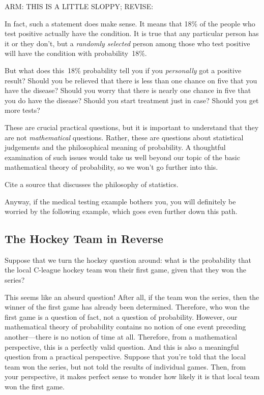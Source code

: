 \begin{editingnotes}
ARM: THIS IS A LITTLE SLOPPY; REVISE:
\end{editingnotes}

In fact, such a statement does make sense.  It means that 18\% of the
people who test positive actually have the condition.  It is true that
any particular person has it or they don't, but a \emph{randomly
  selected} person among those who test positive will have the
condition with probability~18\%.

But what does this~18\% probability tell you if you \emph{personally}
got a positive result?  Should you be relieved that there is less than
one chance on five that you have the disease?  Should you worry that
there is nearly one chance in five that you do have the disease?
Should you start treatment just in case?  Should you get more tests?

These are crucial practical questions, but it is important to
understand that they are not \emph{mathematical} questions.  Rather,
these are questions about statistical judgements and the philosophical
meaning of probability.  A thoughtful examination of such issues would
take us well beyond our topic of the basic mathematical theory of
probability, so we won't go further into this.

\begin{editingnotes}
Cite a source that discusses the philosophy of statistics.
\end{editingnotes}

Anyway, if the medical testing example bothers you, you will
definitely be worried by the following example, which goes even
further down this path.

\subsection{The Hockey Team in Reverse}

Suppose that we turn the hockey question around: what is the
probability that the local C-league hockey team won their first game,
given that they won the series?

This seems like an absurd question!  After all, if the team won the
series, then the winner of the first game has already been determined.
Therefore, who won the first game is a question of fact, not a
question of probability.  However, our mathematical theory of
probability contains no notion of one event preceding another---there
is no notion of time at all.  Therefore, from a mathematical
perspective, this is a perfectly valid question.  And this is also a
meaningful question from a practical perspective.  Suppose that you're
told that the local team won the series, but not told the results
of individual games.  Then, from your perspective, it makes perfect
sense to wonder how likely it is that local team won the first game.

